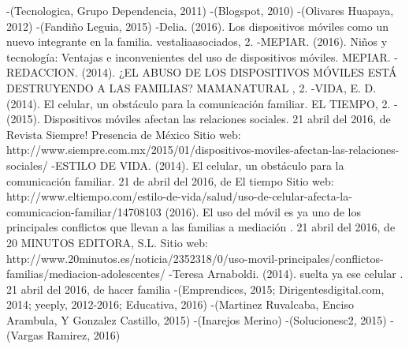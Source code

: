 \documentclass[10pt,a4paper]{article}
\begin{document}
-(Tecnologica, Grupo Dependencia, 2011)
-(Blogspot, 2010)
-(Olivares Huapaya, 2012)
-(Fandi{\~n}o Leguia, 2015)
-Delia. (2016). Los dispositivos m{\'o}viles como un nuevo integrante en la familia. vestaliaasociados, 2.
-MEPIAR. (2016). Ni{\~n}os y tecnolog{\'i}a: Ventajas e inconvenientes del uso de dispositivos m{\'o}viles. MEPIAR.
-REDACCION. (2014). ¿EL ABUSO DE LOS DISPOSITIVOS M{\'O}VILES EST{\'A} DESTRUYENDO A LAS FAMILIAS? MAMANATURAL , 2.
-VIDA, E. D. (2014). El celular, un obst{\'a}culo para la comunicaci{\'o}n familiar. EL TIEMPO, 2.
-(2015). Dispositivos m{\'o}viles afectan las relaciones sociales. 21 abril del 2016, de Revista Siempre! Presencia de M{\'e}xico Sitio web: http://www.siempre.com.mx/2015/01/dispositivos-moviles-afectan-las-relaciones-sociales/
-ESTILO DE VIDA. (2014). El celular, un obst{\'a}culo para la comunicaci{\'o}n familiar. 21 de abril del 2016, de El tiempo Sitio web: http://www.eltiempo.com/estilo-de-vida/salud/uso-de-celular-afecta-la-comunicacion-familiar/14708103
(2016). El uso del m{\'o}vil es ya uno de los principales conflictos que llevan a las familias a mediaci{\'o}n . 21 abril del 2016, de 20 MINUTOS EDITORA, S.L. Sitio web: http://www.20minutos.es/noticia/2352318/0/uso-movil-principales/conflictos-familias/mediacion-adolescentes/
-Teresa Arnaboldi. (2014). suelta ya ese celular . 21 abril del 2016, de hacer familia 
-(Emprendices, 2015; Dirigentesdigital.com, 2014; yeeply, 2012-2016; Educativa, 2016)
-(Martinez Ruvalcaba, Enciso Arambula, Y Gonzalez Castillo, 2015)
-(Inarejos Merino)
-(Solucionesc2, 2015)
-(Vargas Ramirez, 2016)
\end{document}
